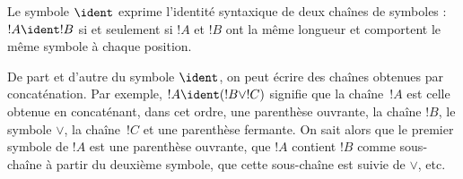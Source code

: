 \documentclass[../../../include/open-logic-section]{subfiles}
\begin{document}
\begin{defn}
Le symbole $\ident$ exprime l'identité syntaxique de deux chaînes de
symboles : $!A \ident !B$ si et seulement si $!A$ et $!B$ ont la même
longueur et comportent le même symbole à chaque position.
\end{defn}

De part et d'autre du symbole $\ident$, on peut écrire des chaînes
obtenues par concaténation. Par exemple, $!A \ident (!B \lor !C)$
signifie que la chaîne~$!A$ est celle obtenue en concaténant, dans cet
ordre, une parenthèse ouvrante, la chaîne $!B$, le symbole $\lor$,
la chaîne~$!C$ et une parenthèse fermante. On sait alors que le premier
symbole de $!A$ est une parenthèse ouvrante, que $!A$ contient $!B$
comme sous-chaîne à partir du deuxième symbole, que cette sous-chaîne
est suivie de $\lor$, etc.
\end{document}
